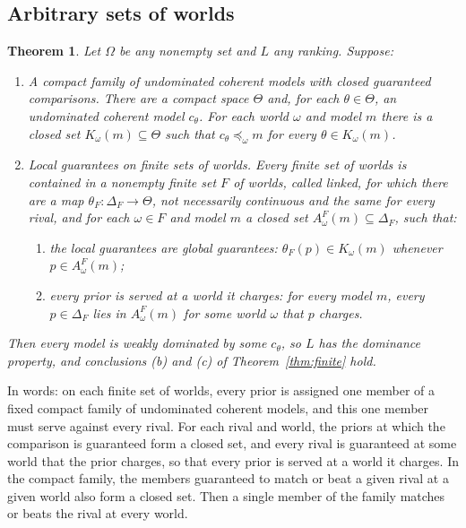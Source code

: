 \documentclass[11pt]{article}
\newtheorem{theorem}{Theorem}[section]
\theoremstyle{definition}
\theoremstyle{remark}
\begin{document}
\subsection{Arbitrary sets of worlds}
\begin{theorem}\label{thm:local}
Let $\Omega$ be any nonempty set and $L$ any ranking. Suppose:
\begin{enumerate}[label=\arabic*.,leftmargin=*]
\item \emph{A compact family of undominated coherent models with closed guaranteed comparisons.} There are a compact space $\Theta$ and, for each $\theta\in\Theta$, an undominated coherent model $c_\theta$. For each world $\omega$ and model $m$ there is a closed set $K_\omega(m)\subseteq\Theta$ such that $c_\theta\preceq_\omega m$ for every $\theta\in K_\omega(m)$.
\item \emph{Local guarantees on finite sets of worlds.} Every finite set of worlds is contained in a nonempty finite set $F$ of worlds, called \emph{linked}, for which there are a map $\theta_F:\Delta_F\to\Theta$, not necessarily continuous and the same for every rival, and for each $\omega\in F$ and model $m$ a closed set $A^F_\omega(m)\subseteq\Delta_F$, such that:
\begin{enumerate}[label=(\alph*)]
\item the local guarantees are global guarantees: $\theta_F(p)\in K_\omega(m)$ whenever $p\in A^F_\omega(m)$;
\item every prior is served at a world it charges: for every model $m$, every $p\in\Delta_F$ lies in $A^F_\omega(m)$ for some world $\omega$ that $p$ charges.
\end{enumerate}
\end{enumerate}
Then every model is weakly dominated by some $c_\theta$, so $L$ has the dominance property, and conclusions (b) and (c) of Theorem~\ref{thm:finite} hold.
\end{theorem}
In words: on each finite set of worlds, every prior is assigned one member of a fixed compact family of undominated coherent models, and this one member must serve against every rival. For each rival and world, the priors at which the comparison is guaranteed form a closed set, and every rival is guaranteed at some world that the prior charges, so that every prior is served at a world it charges. In the compact family, the members guaranteed to match or beat a given rival at a given world also form a closed set. Then a single member of the family matches or beats the rival at every world.
\end{document}
